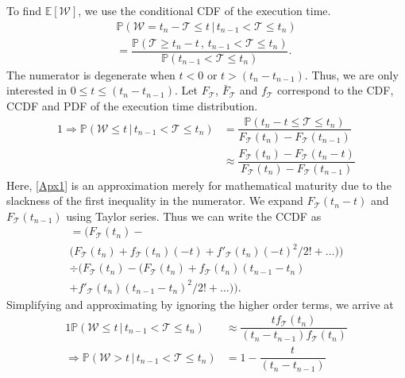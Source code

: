 To find 
$\mathbb{E}[\mathcal{W}]$, we use the conditional \gls{CDF} of the execution time.
\begin{multline*}
\mathbb{P}(\mathcal{W}=t_n-\mathcal{T}\leq t\,\big\vert\,t_{n-1}<\mathcal{T}\leq t_n)\\=\dfrac{\mathbb{P}(\mathcal{T}\geq t_n-t\,,\,t_{n-1}<\mathcal{T}\leq t_n)}{\mathbb{P}(t_{n-1}<\mathcal{T}\leq t_n)}.
\end{multline*}
The numerator is degenerate when $t\!<\!0$ or $t\!>\!(t_n\!-\!t_{n-1})$.
Thus, we are only interested in $0\!\leq\!t\!\leq\! (t_n-t_{n-1})$.
Let $F_{\mathcal{T}}$, $\bar{F}_{\mathcal{T}}$ and $f_{\mathcal{T}}$ correspond to the \gls{CDF}, \gls{CCDF} and \gls{PDF} of the execution time distribution.
\begin{alignat}{1}
\!\!\!\Rightarrow\mathbb{P}(\mathcal{W}\leq t\,\big\vert\,t_{n-1}<\mathcal{T}\leq t_n)&=\dfrac{\mathbb{P}(t_n-t\leq\mathcal{T}\leq t_n)}{F_\mathcal{T}(t_n)-F_\mathcal{T}(t_{n-1})}\nonumber\\
&\approx\dfrac{F_\mathcal{T}(t_n)-F_\mathcal{T}(t_{n}-t)}{F_\mathcal{T}(t_n)-F_\mathcal{T}(t_{n-1})}\label{Apx1}
\end{alignat}
Here, \cref{Apx1} is an approximation merely for mathematical maturity due to the slackness of the first inequality in the numerator.
We expand $F_\mathcal{T}(t_{n}-t)$ and $F_\mathcal{T}(t_{n-1})$ using Taylor series. Thus we can write the \gls{CCDF} as
\begin{multline*}
    =\Big(F_\mathcal{T}(t_n)-\\\big(F_\mathcal{T}(t_n)+f_\mathcal{T}(t_n)(-t)+f'_\mathcal{T}(t_n)(-t)^2/2!+\dots\big)\Big)\\
    \div \Big(F_\mathcal{T}(t_n)-\big(F_\mathcal{T}(t_n)+f_\mathcal{T}(t_n)(t_{n-1}-t_n)\\+f'_\mathcal{T}(t_n)(t_{n-1}-t_n)^2/2!+\dots\big)\Big).
\end{multline*}
Simplifying and approximating by ignoring the higher order terms, we arrive at
\begin{alignat}{1}
\mathbb{P}(\mathcal{W}\leq t\,\big\vert\,t_{n-1}<\mathcal{T}\leq t_n)&\approx\dfrac{tf_\mathcal{T}(t_n)}{(t_{n}-t_{n-1})f_\mathcal{T}(t_n)}\label{Apx2}\\
\Rightarrow\mathbb{P}(\mathcal{W}> t\,|\,t_{n-1}<\mathcal{T}\leq t_n)&= 1-\dfrac{t}{(t_{n}-t_{n-1})}\nonumber
\end{alignat}

